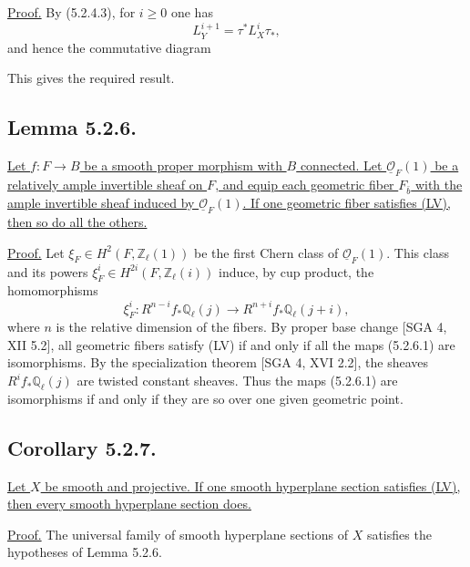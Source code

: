 \underline{Proof.}
By (5.2.4.3), for $i\geq0$ one has
\[
L_Y^{i+1}=\tau^*L_X^i\tau_*,
\]
and hence the commutative diagram
\begin{center}
\end{center}
This gives the required result.

\subsection*{Lemma 5.2.6.}
\underline{Let $f:F\to B$ be a smooth proper morphism with $B$ connected.
Let $\underline{\mathcal O}_F(1)$ be a relatively ample invertible sheaf on
$F$, and equip each geometric fiber $F_{\bar b}$ with the ample invertible
sheaf induced by $\underline{\mathcal O}_F(1)$.  If one geometric fiber
satisfies (LV), then so do all the others.}

\underline{Proof.}
Let
$\xi_F\in H^2(F,\mathbb Z_\ell(1))$ be the first Chern class of
$\underline{\mathcal O}_F(1)$.  This class and its powers
$\xi_F^i\in H^{2i}(F,\mathbb Z_\ell(i))$ induce, by cup product, the
homomorphisms
\begin{equation}\tag{5.2.6.1}
\xi_F^i:R^{n-i}f_*\mathbb Q_\ell(j)
\longrightarrow R^{n+i}f_*\mathbb Q_\ell(j+i),
\end{equation}
where $n$ is the relative dimension of the fibers.  By proper base change
[SGA 4, XII 5.2], all geometric fibers satisfy (LV) if and only if all the
maps (5.2.6.1) are isomorphisms.  By the specialization theorem
[SGA 4, XVI 2.2], the sheaves $R^if_*\mathbb Q_\ell(j)$ are twisted constant
sheaves.  Thus the maps (5.2.6.1) are isomorphisms if and only if they are so
over one given geometric point.

\subsection*{Corollary 5.2.7.}
\underline{Let $X$ be smooth and projective.  If one smooth hyperplane
section satisfies (LV), then every smooth hyperplane section does.}

\underline{Proof.}
The universal family of smooth hyperplane sections of $X$ satisfies the
hypotheses of Lemma 5.2.6.
